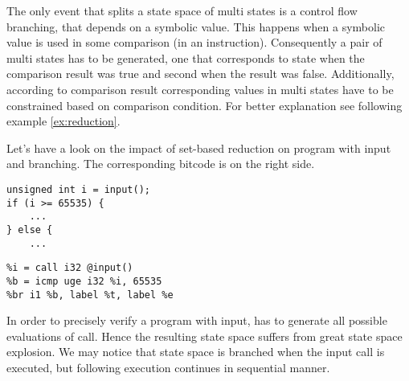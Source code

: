 The only event that splits a state space of multi states is a control flow branching,
that depends on a symbolic value. This happens when a symbolic value is used in
some comparison (in \LLVM an  instruction). Consequently a pair of
multi states has to be generated, one that corresponds to state when the
comparison result was true and second when the result was false. Additionally,
according to comparison result corresponding values in multi states have
to be constrained based on comparison condition. For better explanation see
following example \ref{ex:reduction}.

\begin{example}\label{ex:reduction}
Let's have a look on the impact of set-based reduction on program with input and
branching. The corresponding \LLVM bitcode is on the right side.

\begin{center}
\begin{minipage}[t]{.47\textwidth}
\begin{verbatim}
unsigned int i = input();
if (i >= 65535) {
    ...
} else {
    ...
\end{verbatim}
\end{minipage}\hfill
\begin{minipage}[t]{.47\textwidth}
\begin{verbatim}
%i = call i32 @input()
%b = icmp uge i32 %i, 65535
%br i1 %b, label %t, label %e
\end{verbatim}
\end{minipage}
\end{center}

\bigskip
\noindent
In order to precisely verify a program with input, \DIVINE has to generate all
possible evaluations of  call. Hence the resulting state space suffers
from great state space explosion. We may notice that state space is branched when
the input call is executed, but following execution continues in sequential
manner.

\begin{centering}
\end{centering}
\end{example}
